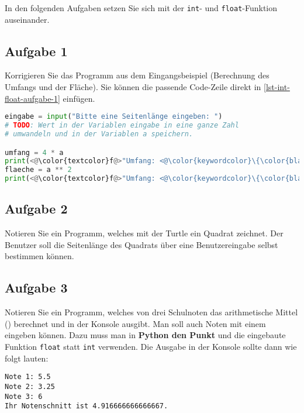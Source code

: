 In den folgenden Aufgaben setzen Sie sich mit der \lstinline{int}- und \lstinline{float}-Funktion auseinander.

\subsection{Aufgabe 1}

Korrigieren Sie das Programm aus dem Eingangsbeispiel (Berechnung des Umfangs und der Fläche). Sie können die passende Code-Zeile direkt in \autoref{lst-int-float-aufgabe-1} einfügen.

\begin{lstlisting}[language=python, caption={Geometrische Berechnungen am Quadrat.}, label=lst-int-float-aufgabe-1]
eingabe = input("Bitte eine Seitenlänge eingeben: ")
# TODO: Wert in der Variablen eingabe in eine ganze Zahl
# umwandeln und in der Variablen a speichern.

umfang = 4 * a
print(<@\color{textcolor}f@>"Umfang: <@\color{keywordcolor}\{\color{black}umfang\color{keywordcolor}\}@>")
flaeche = a ** 2
print(<@\color{textcolor}f@>"Umfang: <@\color{keywordcolor}\{\color{black}flaeche\color{keywordcolor}\}@>")
\end{lstlisting}

\subsection{Aufgabe 2}

Notieren Sie ein Programm, welches mit der Turtle ein Quadrat zeichnet. Der Benutzer soll die Seitenlänge des Quadrats über eine Benutzereingabe selbst bestimmen können.


\newpage

\subsection{Aufgabe 3}

Notieren Sie ein Programm, welches von drei Schulnoten das arithmetische Mittel () berechnet und in der Konsole ausgibt. Man soll auch Noten mit einem  eingeben können. Dazu muss man in \textbf{Python den Punkt} und die eingebaute Funktion \lstinline{float} statt \lstinline{int} verwenden. Die Ausgabe in der Konsole sollte dann wie folgt lauten:

\begin{lstlisting}[language=output]
Note 1: 5.5
Note 2: 3.25
Note 3: 6
Ihr Notenschnitt ist 4.916666666666667.
\end{lstlisting}

